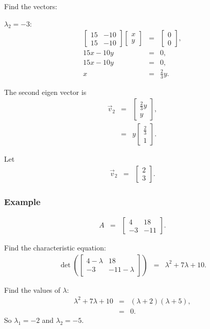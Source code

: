 \documentclass{beamer}
\newcommand{\lp}{\left(}
\newcommand{\rp}{\right)}
\newcommand{\arrayTwo}[4]{
  \left[
  \begin{array}{rr}
    #1 & #2 \\
    #3 & #4
  \end{array}
  \right]
}
\newcommand{\vecTwo}[2]{
  \left[
  \begin{array}{r}
    #1 \\  #2
  \end{array}
  \right]
}
\begin{document}
\begin{frame}
  Find the vectors:

  $\lambda_2 = -3$:
  \begin{eqnarray*}
    \arrayTwo{15}{-10}{15}{-10} \vecTwo{x}{y} & = & \vecTwo{0}{0}, \\
    15x - 10y & = & 0, \\
    15x - 10y & = & 0, \\
    x & = & \frac{2}{3} y.
  \end{eqnarray*}

  The second eigen vector is 
  \begin{eqnarray*}
    \vec{v}_2 & = & \vecTwo{\frac{2}{3}y}{y}, \\
    & = & y \vecTwo{\frac{2}{3}}{1}.
  \end{eqnarray*}

  Let
  \begin{eqnarray*}
    \vec{v}_2 & = & \vecTwo{2}{3}.
  \end{eqnarray*}

\end{frame}






\begin{frame}
  \frametitle{Example}

  \begin{eqnarray*}
    A & = & \arrayTwo{4}{18}{-3}{-11}.
  \end{eqnarray*}

  Find the characteristic equation:
  \begin{eqnarray*}
    \det\lp\arrayTwo{4-\lambda}{18}{-3}{-11-\lambda}\rp & = & \lambda^2+7\lambda+10.
  \end{eqnarray*}

  Find the values of $\lambda$:
  \begin{eqnarray*}
    \lambda^2+7\lambda+10 & = & (\lambda+2)(\lambda+5), \\
    & = & 0.
  \end{eqnarray*}
  So $\lambda_1 = -2$ and $\lambda_2=-5$.


\end{frame}
\end{document}

